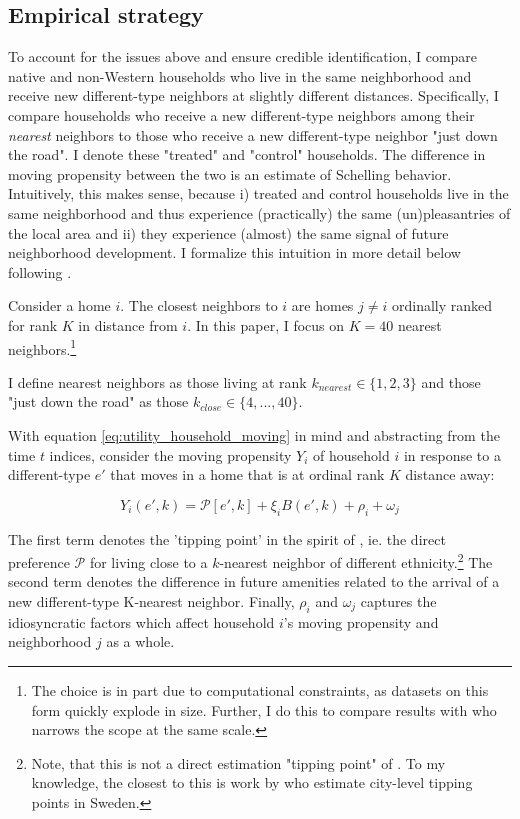 \documentclass[../main.tex]{subfiles}
\begin{document}
\subsection{Empirical strategy}
To account for the issues above and ensure credible identification, I compare native and non-Western households who live in the same neighborhood and receive new different-type neighbors at slightly different distances.  Specifically, I compare households who receive a new different-type neighbors among their \textit{nearest} neighbors to those who receive a new different-type neighbor "just down the road". I denote these "treated" and "control" households. The difference in moving propensity between the two is an estimate of Schelling behavior. Intuitively, this makes sense, because i) treated and control households live in the same neighborhood and thus experience (practically) the same (un)pleasantries of the local area and ii) they experience (almost) the same signal of future neighborhood development. I formalize this intuition in more detail below following \textcite{Bayer_2022_nearest_neighbor}.

Consider a home $i$. The closest neighbors to $i$ are homes $j\neq i$ ordinally ranked for rank $K$ in distance from $i$. 
In this paper, I focus on $K=40$ nearest neighbors.\footnote{The choice is in part due to computational constraints, as datasets on this form quickly explode in size. Further, I do this to compare results with \textcite{Bayer_2022_nearest_neighbor} who narrows the scope at the same scale.}

I define nearest neighbors as those living at rank $k_{nearest}\in \{1, 2, 3\}$ and those "just down the road" as those $k_{close} \in \{4, ..., 40\}$. 

With equation \ref{eq:utility_household_moving} in mind and abstracting from the time $t$ indices, consider the moving propensity $Y_i$ of household $i$ in response to a different-type $e'$ that moves in a home that is at ordinal rank $K$ distance away:

\begin{equation}
    Y_i(e', k) = \mathcal{P}[e', k] + \xi_i B(e', k) + \rho_i + \omega_j
\end{equation}

The first term denotes the 'tipping point' in the spirit of \textcite{schelling1971dynamic}, ie. the direct preference $\mathcal{P}$ for living close to a $k$-nearest neighbor of different ethnicity.\footnote{Note, that this is not a direct estimation "tipping point" of \textcite{schelling1971dynamic}. To my knowledge, the closest to this is work by \textcite{bohlmark_willen_2020_tipping} who estimate city-level tipping points in Sweden.}   The second term denotes the difference in future amenities related  to the arrival of a new different-type K-nearest neighbor. Finally, $\rho_i$ and $\omega_j$ captures the idiosyncratic factors which affect household $i$'s moving propensity and neighborhood $j$ as a whole. 
\end{document}
